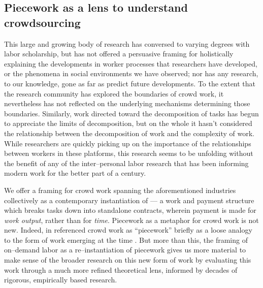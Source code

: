 \documentclass[trackingWork]{subfiles}
\begin{document}
\subsection{Piecework as a lens to understand crowdsourcing}
This large and growing body of research has conversed
to varying degrees with labor scholarship,
but has not offered a persuasive framing for holistically explaining
the developments in worker processes that researchers have developed, or
the phenomena in social environments we have observed;
nor has any research, to our knowledge,
gone as far as predict future developments.
To the extent that the research community has explored the boundaries of crowd work,
it nevertheless has not reflected on the underlying mechanisms determining those boundaries.
Similarly, work directed toward the decomposition of tasks has begun to appreciate the limits of decomposition,
but on the whole it hasn't considered the relationship between the decomposition of work and the complexity of work.
While researchers are quickly picking up on the importance of
the relationships between workers in these platforms,
this research seems to be unfolding without the benefit of any of
the inter--personal labor research that has been informing modern work for the better part of a century.

We offer a framing for crowd work spanning the aforementioned industries
collectively as a contemporary instantiation of  ---
a work and payment structure which breaks tasks down into standalone contracts,
wherein payment is made for \textit{work output}, rather than for \textit{time}.
Piecework as a metaphor for crowd work is not new.
Indeed,
\citeauthor{crowdworkFuture} in \citeyear{crowdworkFuture}
referenced crowd work as ``piecework'' briefly
as a loose analogy to the form of work emerging at the time
\cite{crowdworkFuture}.
But more than this,
the framing of on--demand labor as a re--instantiation of piecework
gives us more material to make sense of the broader research on this new form of work
by evaluating this work through a much more refined theoretical lens,
informed by decades of rigorous, empirically based research.
\end{document}
